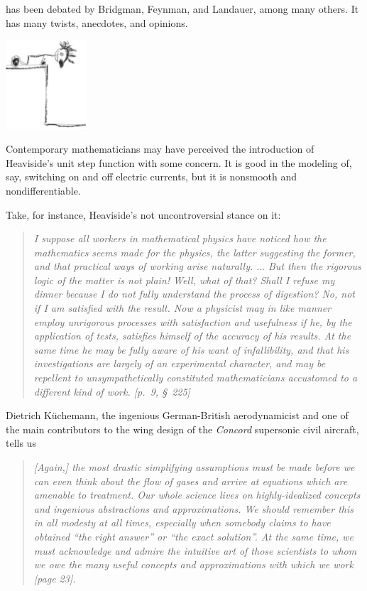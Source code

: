  has been debated by
Bridgman\cite{bridgman},
Feynman\cite{feynman-computation},
and  Landauer\cite{landauer},
among many others.
It has many twists, anecdotes, and opinions.
\begin{marginfigure}
\begin{center}
\includegraphics[width=3cm]{2018-mm-cartoon-Heaviside2}
\caption{Contemporary mathematicians may have perceived the introduction of Heaviside's unit step function with some concern.
It is good in the modeling of, say, switching on and off electric currents, but it is nonsmooth and nondifferentiable.}
\label{2018-m-cartoon-Heaviside1}
\end{center}
\end{marginfigure}
Take, for instance, Heaviside's not uncontroversial stance\cite{heaviside-EMT} on it:
\begin{quote}
{\em
I suppose all workers
in mathematical physics have noticed how the mathematics
seems made for the physics, the latter suggesting the former, and
that practical ways of working arise naturally. $\ldots$ But then the
rigorous logic of the matter is not plain! Well, what of that?
Shall I refuse my dinner because I do not fully understand the
process of digestion? No, not if I am satisfied with the result.
Now a physicist may in like manner employ unrigorous processes with satisfaction and usefulness if he, by the application
of tests, satisfies himself of the accuracy of his results. At
the same time he may be fully aware of his want of infallibility,
and that his investigations are largely of an experimental character, and may be repellent to unsympathetically
constituted mathematicians accustomed to a different kind
of work.  [p.~9, \S~225]
}
\label{2013-m-ch-intro-cooking}
\end{quote}


Dietrich K\"uchemann,
the ingenious German-British aerodynamicist and
one of the main contributors to the wing design of the {\em Concord} supersonic civil aircraft, tells us
\cite{Kuchemann}
\begin{quote}
{\em
[Again,] the most drastic simplifying assumptions must be made before we can even think about
the flow of gases and arrive at equations which are amenable to treatment. Our whole
science lives on highly-idealized concepts and ingenious abstractions and approximations.
We should remember this in all modesty at all times, especially when somebody claims to
have obtained ``the right answer'' or ``the exact solution''.
At the same time, we must acknowledge and admire the intuitive art of those scientists
to whom we owe the many useful concepts and approximations with which we work [page 23].
}
\end{quote}



